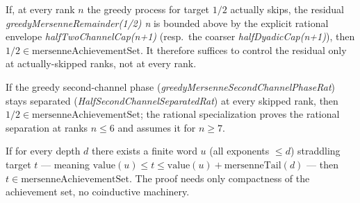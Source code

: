 \begin{thm}
\label{thm:two-channel-cap}
If, at every rank $n$ the greedy process for target $1/2$ actually skips, the residual
\emph{greedyMersenneRemainder(1/2) n} is bounded above by the explicit rational envelope
\emph{halfTwoChannelCap(n+1)} (resp.\ the coarser \emph{halfDyadicCap(n+1)}), then
$1/2\in\mathrm{mersenneAchievementSet}$. It therefore suffices to control the residual
only at actually-skipped ranks, not at every rank.
\par{}
\end{thm}

\begin{thm}
\label{thm:second-channel}
If the greedy second-channel phase (\emph{greedyMersenneSecondChannelPhaseRat}) stays
separated (\emph{HalfSecondChannelSeparatedRat}) at every skipped rank, then
$1/2\in\mathrm{mersenneAchievementSet}$; the rational specialization proves the rational
separation at ranks $n\le6$ and assumes it for $n\ge7$.
\par{}
\end{thm}

\begin{thm}
\label{thm:straddle-closed-set}
If for every depth $d$ there exists a finite word $u$ (all exponents $\le d$) straddling
target $t$ — meaning $\mathrm{value}(u)\le t\le \mathrm{value}(u)+\mathrm{mersenneTail}(d)$
— then $t\in\mathrm{mersenneAchievementSet}$. The proof needs only compactness of the
achievement set, no coinductive machinery.
\par{}
\end{thm}


